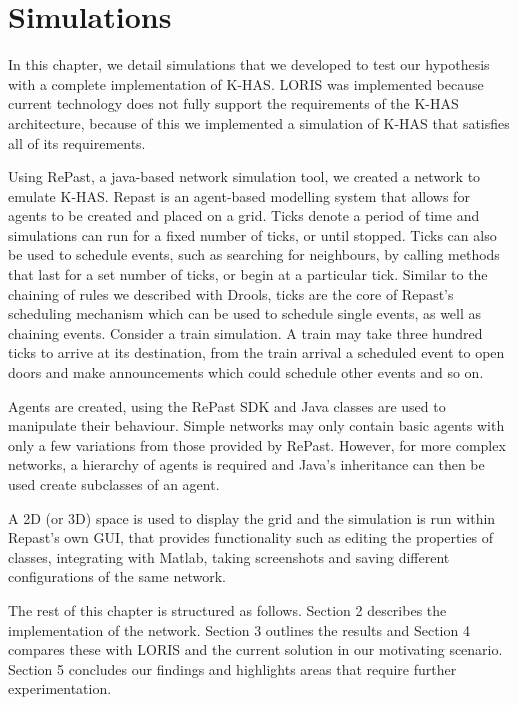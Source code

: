 \chapter{Simulations}
In this chapter, we detail simulations that we developed to test our hypothesis with a complete implementation of K-HAS. LORIS was implemented because current technology does not fully support the requirements of the K-HAS architecture, because of this we implemented a simulation of K-HAS that satisfies all of its requirements.

Using RePast, a java-based network simulation tool, we created a network to emulate K-HAS. Repast is an agent-based modelling system that allows for agents to be created and placed on a grid. Ticks denote a period of time and simulations can run for a fixed number of ticks, or until stopped. Ticks can also be used to schedule events, such as searching for neighbours, by calling methods that last for a set number of ticks, or begin at a particular tick. Similar to the chaining of rules we described with Drools, ticks are the core of Repast's scheduling mechanism which can be used to schedule single events, as well as chaining events. Consider a train simulation. A train may take three hundred ticks to arrive at its destination, from the train arrival a scheduled event to open doors and make announcements which could schedule other events and so on.

Agents are created, using the RePast SDK and Java classes are used to manipulate their behaviour. Simple networks may only contain basic agents with only a few variations from those provided by RePast. However, for more complex networks, a hierarchy of agents is required and Java's inheritance can then be used create subclasses of an agent.

A 2D (or 3D) space is used to display the grid and the simulation is run within Repast's own GUI, that provides functionality such as editing the properties of classes, integrating with Matlab, taking screenshots and saving different configurations of the same network.

The rest of this chapter is structured as follows. Section 2 describes the implementation of the network. Section 3 outlines the results and Section 4 compares these with LORIS and the current solution in our motivating scenario. Section 5 concludes our findings and highlights areas that require further experimentation.

